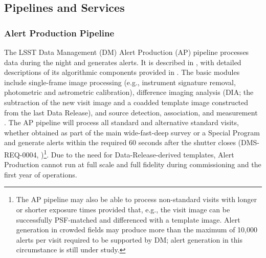 \subsection{Pipelines and Services}

\subsubsection{Alert Production Pipeline}\label{sec:AP}

The LSST Data Management (DM) Alert Production (AP) pipeline processes data during the night and generates alerts.
It is described in , with detailed descriptions of its algorithmic components provided in .
The basic modules include single-frame image processing (e.g., instrument signature removal, photometric and astrometric calibration), difference imaging analysis (DIA; the subtraction of the new visit image and a coadded template image constructed from the last Data Release), and source detection, association, and measurement .
The AP pipeline will process all standard and alternative standard visits, whether obtained as part of the main wide-fast-deep survey or a Special Program  and generate alerts within the required 60 seconds after the shutter closes (DMS-REQ-0004, )\footnote{
The AP pipeline may also be able to process non-standard visits with longer or shorter exposure times provided that, e.g., the visit image can be successfully PSF-matched and differenced with a template image.
Alert generation in crowded fields may produce more than the maximum of 10,000 alerts per visit required to be supported by DM; alert generation in this circumstance is still under study.
}.  
Due to the need for Data-Release-derived templates, Alert Production cannot run at full scale and full fidelity during commissioning and the first year of operations.

